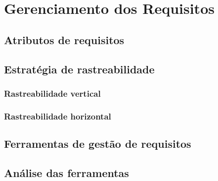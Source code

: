 \chapter[Gerenciamento dos Requisitos]{Gerenciamento dos Requisitos}

  \section{Atributos de requisitos}
  
  \section{Estratégia de rastreabilidade}
  
    \subsection{Rastreabilidade vertical}
    
    \subsection{Rastreabilidade horizontal}
    
  \section{Ferramentas de gestão de requisitos}
  
    \section{Análise das ferramentas}
    
